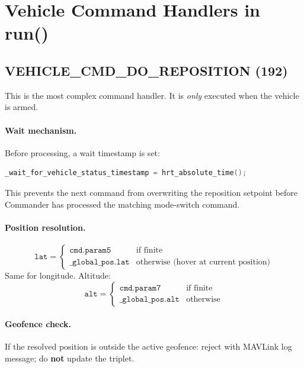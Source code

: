 \documentclass[12pt,a4paper]{article}
\begin{document}
\section{Vehicle Command Handlers in run()}
\label{sec:commands}

\subsection{VEHICLE\_CMD\_DO\_REPOSITION (192)}

This is the most complex command handler. It is \emph{only} executed when
the vehicle is armed.

\paragraph{Wait mechanism.}
Before processing, a wait timestamp is set:
\begin{lstlisting}[language=C++]
_wait_for_vehicle_status_timestamp = hrt_absolute_time();
\end{lstlisting}
This prevents the next command from overwriting the reposition setpoint before
Commander has processed the matching mode-switch command.

\paragraph{Position resolution.}
\begin{equation}
  \texttt{lat} = \begin{cases}
    \texttt{cmd.param5} & \text{if finite} \\
    \texttt{\_global\_pos.lat} & \text{otherwise (hover at current position)}
  \end{cases}
\end{equation}
Same for longitude. Altitude:
\begin{equation}
  \texttt{alt} = \begin{cases}
    \texttt{cmd.param7} & \text{if finite} \\
    \texttt{\_global\_pos.alt} & \text{otherwise}
  \end{cases}
\end{equation}

\paragraph{Geofence check.}
If the resolved position is outside the active geofence:
reject with MAVLink log message; do \textbf{not} update the triplet.
\end{document}
